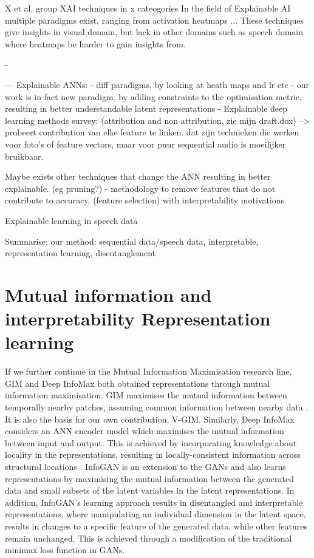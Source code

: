 	
	
	X et al. group XAI techniques in x cateogories
		In the field of Explainable AI multiple paradigms exist, ranging from activation heatmaps ...
	These techniques give insights in visual domain, but lack in other domains such as speech domain where heatmaps be harder to gain insights from.
	
		
	
	- 

---
Explainable ANNs:
	- diff paradigms, by looking at heath maps and lr etc
	- our work is in fact new paradigm, by adding constraints to the optimisation metric, resulting in better understandable latent representations
	- Explainable deep learning methods survey: \cite{baiExplainableDeepLearning2021} (attribution and non attribution, zie mijn draft.dox) --> probeert contribution van elke feature te linken. dat zijn technieken die werken voor foto's of feature vectors, maar voor puur sequential audio is moeilijker bruikbaar.
	
	Maybe exists other techniques that change the ANN resulting in better explainable. (eg pruning?)
	- methodology to remove features that do not contribute to accuracy. (feature selection) with interpretability motivations. \cite{glorfeldMethodologySimplificationInterpretation1996}
	
	
Explainable learning in speech data


Summarise: our method: sequential data/speech data, interpretable, representation learning, disentanglement

\section{Mutual information and interpretability Representation learning}

	If we further continue in the Mutual Information Maximisation research line, GIM and Deep InfoMax both obtained representations through mutual information maximisation. GIM maximises the mutual information between temporally nearby patches, assuming common information between nearby data \cite{lowePuttingEndEndtoEnd2020}. It is also the basis for our own contribution, V-GIM. Similarly, Deep InfoMax considers an ANN encoder model which maximises the mutual information between input and output. This is achieved by incorporating knowledge about locality in the representations, resulting in locally-consistent information across structural locations \cite{hjelmLearningDeepRepresentations2019}.
	InfoGAN \cite{chenInfoGANInterpretableRepresentation2016} is an extension to the GANs and also learns representations by maximising the mutual information between the generated data and small subsets of the latent variables in the latent representations. In addition, InfoGAN's learning approach results in disentangled and interpretable representations, where manipulating an individual dimension in the latent space, results in changes to a specific feature of the generated data, while other features remain unchanged. This is achieved through a modification of the traditional minimax loss function in GANs.
	
